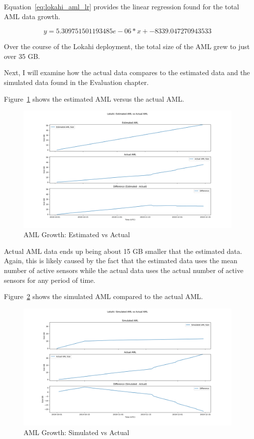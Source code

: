 Equation~\ref{eq:lokahi_aml_lr} provides the linear regression found for the total AML data growth.

\begin{equation}
    y = 5.309751501193485e-06 * x + -8339.047270943533
    \label{eq:lokahi_aml_lr}
\end{equation}

Over the course of the Lokahi deployment, the total size of the AML grew to just over 35 GB.

Next, I will examine how the actual data compares to the estimated data and the simulated data found in the Evaluation chapter.

Figure~\ref{fig:lokahi_actual_aml_vs_est} shows the estimated AML versus the actual AML.

\begin{figure}[H]
    \centering
    \includegraphics[width=\linewidth]{figures/lokahi_actual_aml_vs_est.png}
    \caption{AML Growth: Estimated vs Actual}
    \label{fig:lokahi_actual_aml_vs_est}
\end{figure}

Actual AML data ends up being about 15 GB smaller that the estimated data. Again, this is likely caused by the fact that the estimated data uses the mean number of active sensors while the actual data uses the actual number of active sensors for any period of time.

Figure~\ref{fig:lokahi_actual_aml_vs_sim} shows the simulated AML compared to the actual AML.

\begin{figure}[H]
    \centering
    \includegraphics[width=\linewidth]{figures/lokahi_actual_aml_vs_sim.png}
    \caption{AML Growth: Simulated vs Actual}
    \label{fig:lokahi_actual_aml_vs_sim}
\end{figure}

